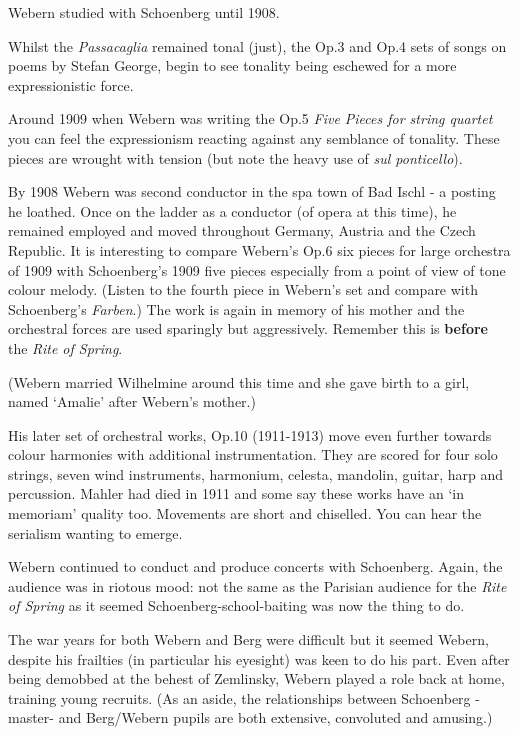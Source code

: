 Webern studied with Schoenberg until 1908.

Whilst the \textit{Passacaglia} remained tonal (just), the Op.3 and Op.4 sets of songs on poems by Stefan George, begin to see tonality being eschewed for a more expressionistic force. 

Around 1909 when Webern was writing the Op.5 \textit{Five Pieces for string quartet} you can feel the expressionism reacting against any semblance of tonality. These pieces are wrought with tension (but note the heavy use of \textit{sul ponticello}). 

By 1908 Webern was second conductor in the spa town of Bad Ischl - a posting he loathed. Once on the ladder as a conductor (of opera at this time), he remained employed and moved throughout Germany, Austria and the Czech Republic. It is interesting to compare Webern's Op.6 six pieces for large orchestra of 1909 with Schoenberg's 1909 five pieces especially from a point of view of tone colour melody. (Listen to the fourth piece in Webern's set and compare with Schoenberg's \textit{Farben}.) The work is again in memory of his mother and the orchestral forces are used sparingly but aggressively. Remember this is \textbf{before} the \textit{Rite of Spring}.

(Webern married Wilhelmine around this time and she gave birth to a girl, named `Amalie' after Webern's mother.)

His later set of orchestral works, Op.10 (1911-1913) move even further towards colour harmonies with additional instrumentation. They are scored for four solo strings, seven wind instruments, harmonium, celesta, mandolin, guitar, harp and percussion. Mahler had died in 1911 and some say these works have an `in memoriam' quality too. Movements are short and chiselled. You can hear the serialism wanting to emerge. 

Webern continued to conduct and produce concerts with Schoenberg. Again, the audience was in riotous mood: not the same as the Parisian audience for the \textit{Rite of Spring} as it seemed Schoenberg-school-baiting was now the thing to do. 

The war years for both Webern and Berg were difficult but it seemed Webern, despite his frailties (in particular his eyesight) was keen to do his part. Even after being demobbed at the behest of Zemlinsky, Webern played a role back at home, training young recruits. (As an aside, the relationships between Schoenberg - master- and Berg/Webern pupils are both extensive, convoluted and amusing.)

